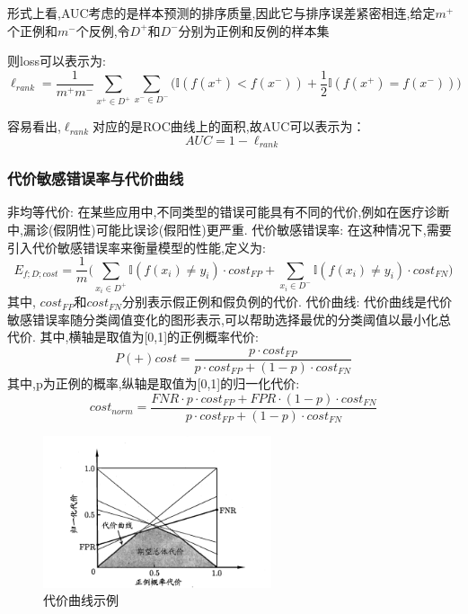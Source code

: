 形式上看,AUC考虑的是样本预测的排序质量,因此它与排序误差紧密相连,给定$m^+$个正例和$m^-$个反例,令$D^+$和$D^-$分别为正例和反例的样本集

则loss可以表示为:
\begin{equation}
    \ell_{rank} = \frac{1}{m^+ m^-} \sum_{x^+ \in D^+} \sum_{x^- \in D^-}\big( \mathbb{I}(f(x^+) <f(x^-))+\frac{1}{2}\mathbb{I}(f(x^+) = f(x^-))\big)
\end{equation}

容易看出,$\ell_{rank}$对应的是ROC曲线上的面积,故AUC可以表示为：
\begin{equation}
    AUC = 1 - \ell_{rank}
\end{equation}
\subsubsection{代价敏感错误率与代价曲线}
非均等代价: 在某些应用中,不同类型的错误可能具有不同的代价,例如在医疗诊断中,漏诊(假阴性)可能比误诊(假阳性)更严重.
代价敏感错误率: 在这种情况下,需要引入代价敏感错误率来衡量模型的性能,定义为:
\begin{equation}
    E_{f;D;cost} = \frac{1}{m} \big(\sum_{x_i \in D^+} \mathbb{I}(f(x_i) \neq y_i) \cdot cost_{FP} + \sum_{x_i \in D^-} \mathbb{I}(f(x_i) \neq y_i) \cdot cost_{FN}\big)
\end{equation}
其中, $cost_{FP}$和$cost_{FN}$分别表示假正例和假负例的代价.
代价曲线: 代价曲线是代价敏感错误率随分类阈值变化的图形表示,可以帮助选择最优的分类阈值以最小化总代价.
其中,横轴是取值为[0,1]的正例概率代价:
\begin{equation}
    P(+)cost=\frac{p \cdot cost_{FP}}{p \cdot cost_{FP} + (1-p) \cdot cost_{FN}}
\end{equation}
其中,p为正例的概率,纵轴是取值为[0,1]的归一化代价:
\begin{equation}
    cost_{norm}=\frac{FNR \cdot p \cdot cost_{FP} + FPR \cdot (1-p) \cdot cost_{FN}}{p \cdot cost_{FP} + (1-p) \cdot cost_{FN}}
\end{equation}
\begin{figure}[H]
    \centering
    \includegraphics[width=0.6\textwidth]{static/images/代价曲线与期望总体代价.png}
    \caption{代价曲线示例}
    \label{fig:cost_curve}
\end{figure}
